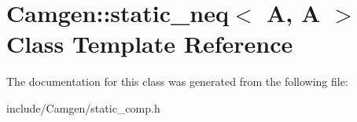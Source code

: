 \hypertarget{a00509}{\section{Camgen\-:\-:static\-\_\-neq$<$ A, A $>$ Class Template Reference}
\label{a00509}
}


The documentation for this class was generated from the following file\-:\begin{DoxyCompactItemize}
\item 
include/\-Camgen/static\-\_\-comp.\-h\end{DoxyCompactItemize}
